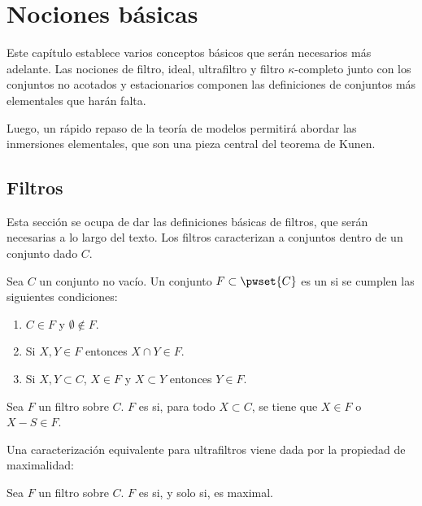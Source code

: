 \chapter{Nociones básicas}

Este capítulo establece varios conceptos básicos que serán necesarios
más adelante. Las nociones de filtro, ideal, ultrafiltro y filtro $\kappa$-completo
junto con los conjuntos no acotados y estacionarios componen las definiciones de
conjuntos más elementales que harán falta.

Luego, un rápido repaso de la teoría de modelos permitirá abordar las inmersiones
elementales, que son una pieza central del teorema de Kunen.

\section{Filtros}

Esta sección se ocupa de dar las definiciones básicas de filtros,
que serán necesarias a lo largo del texto.
Los filtros caracterizan a conjuntos  dentro
de un conjunto dado $C$.

\begin{defi}
    Sea $C$ un conjunto no vacío. Un conjunto $F\subset \pwset{C}$ es un
     si se cumplen las siguientes condiciones:
    \begin{enumerate}[label=\alph*)]
        \item $C\in F$ y $\emptyset\notin F$.
        \item Si $X,Y\in F$ entonces $X\cap Y\in F$.
        \item Si $X,Y\subset C$, $X\in F$ y $X\subset Y$ entonces $Y\in F$.
    \end{enumerate}
\end{defi}

\begin{defi}
    Sea $F$ un filtro sobre $C$. $F$ es  si, para todo $X\subset C$,
    se tiene que $X\in F$ o $X-S\in F$.
\end{defi}

Una caracterización equivalente para ultrafiltros viene dada por la propiedad
de maximalidad:

\begin{teo}
    Sea $F$ un filtro sobre $C$. $F$ es  si, y solo si, es maximal.
\end{teo}

